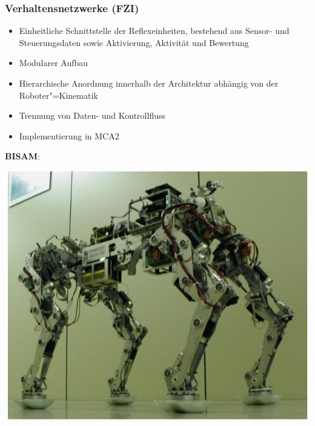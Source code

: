 \subsubsection{Verhaltensnetzwerke (FZI)}
\begin{itemize}
	\item Einheitliche Schnittstelle der Reflexeinheiten, bestehend aus Sensor- und Steuerungsdaten sowie Aktivierung, Aktivität und Bewertung
	\item Modularer Aufbau
	\item Hierarchische Anordnung innerhalb der Architektur abhängig von der Roboter"=Kinematik
	\item Trennung von Daten- und Kontrollfluss
	\item Implementierung in MCA2
\end{itemize}

\textbf{BISAM}:\\
\begin{center}
\includegraphics[width=.5\textwidth]{figures/bisam.png}
\end{center}

